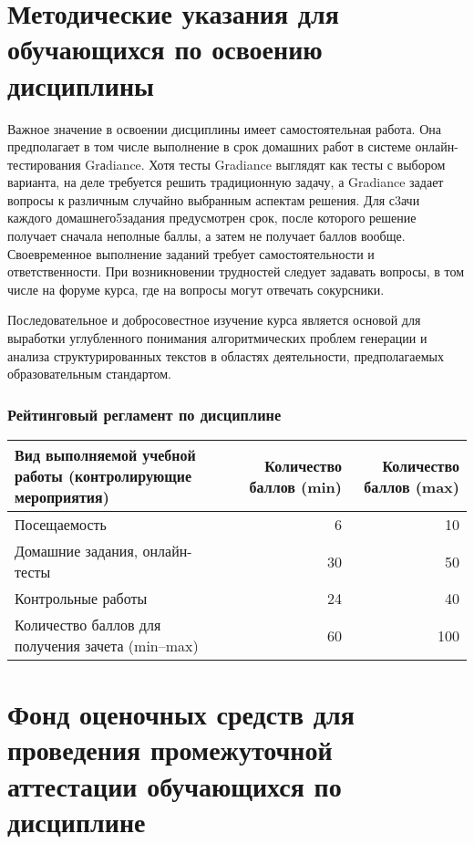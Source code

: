 \documentclass[a4paper,12pt]{article}
\begin{document}
\section{Методические указания для обучающихся по освоению дисциплины}
Важное значение в освоении
дисциплины имеет самостоятельная работа. Она предполагает
в том числе выполнение в срок домашних работ в системе
онлайн-тестирования Grаdiance. Хотя тесты Gradiance
выглядят как тесты с выбором варианта, на деле требуется
решить традиционную задачу, а Gradiance задает вопросы
к различным случайно выбранным аспектам решения. Для
с3ачи каждого домашнего5задания предусмотрен срок,
после которого решение получает сначала неполные баллы,
а затем не получает баллов вообще. Своевременное выполнение
заданий требует самостоятельности и ответственности. При
возникновении трудностей следует задавать вопросы, в том числе
на форуме курса, где на вопросы могут отвечать сокурсники.
\par
Последовательное и добросовестное изучение курса является основой для
выработки углубленного понимания алгоритмических проблем генерации и анализа
структурированных текстов в областях деятельности, предполагаемых образовательным
стандартом.


\newpage
\subsubsection*{Рейтинговый регламент по дисциплине}
\begin{longtable}{|>{\raggedright\arraybackslash}p{110mm}|r|r|}
\hline
\centering\arraybackslash Вид выполняемой учебной работы (контролирующие мероприятия) & 
\multicolumn{1}{p{20mm}|}{\centering\arraybackslash Количество баллов (min)} & 
\multicolumn{1}{p{20mm}|}{\centering\arraybackslash Количество баллов (max)} \\
\hline
Посещаемость                    & 6 & 10 \\ 
\hline
Домашние задания, онлайн-тесты  & 30 & 50 \\ 
\hline
Контрольные работы              & 24 & 40 \\ 
\hline
Количество баллов для получения зачета (min--max) & 60 & 100 \\ 

\hline
\end{longtable}

\section{Фонд оценочных средств для проведения промежуточной аттестации обучающихся по дисциплине}
\end{document}
